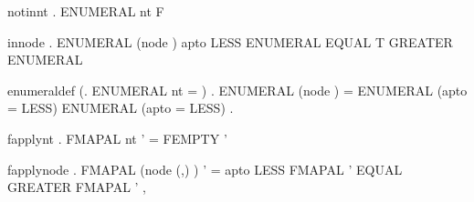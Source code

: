 \newcommand{\headingthree}[1]{\smallskip\noindent\textbf{#1}\ \ }
\begin{SaveVerbatim}{notinnt}
\HOLTokenTurnstile{} \HOLTokenForall{} .  \HOLTokenIn{} ENUMERAL  nt \HOLTokenEquiv{} F
\end{SaveVerbatim}
\begin{SaveVerbatim}{innode}
\HOLTokenTurnstile{} \HOLTokenForall{}    .
      \HOLTokenIn{} ENUMERAL  (node   ) \HOLTokenEquiv{}
      apto    
       LESS \HOLTokenImp{}  \HOLTokenIn{} ENUMERAL  
     \HOLTokenBar{} EQUAL \HOLTokenImp{} T
     \HOLTokenBar{} GREATER \HOLTokenImp{}  \HOLTokenIn{} ENUMERAL  
\end{SaveVerbatim}
\begin{SaveVerbatim}{enumeraldef}
\HOLTokenTurnstile{} (\HOLTokenForall{}. ENUMERAL  nt = \HOLTokenLeftbrace{}\HOLTokenRightbrace{}) \HOLTokenConj{}
   \HOLTokenForall{}   .
     ENUMERAL  (node   ) =
     \HOLTokenLeftbrace{} \HOLTokenBar{}  \HOLTokenIn{} ENUMERAL   \HOLTokenConj{} (apto    = LESS)\HOLTokenRightbrace{} \HOLTokenUnion{} \HOLTokenLeftbrace{}\HOLTokenRightbrace{} \HOLTokenUnion{}
     \HOLTokenLeftbrace{} \HOLTokenBar{}  \HOLTokenIn{} ENUMERAL   \HOLTokenConj{} (apto    = LESS)\HOLTokenRightbrace{} .
\end{SaveVerbatim}
\begin{SaveVerbatim}{fapplynt}
\HOLTokenTurnstile{} \HOLTokenForall{} . FMAPAL  nt '  = FEMPTY ' 
\end{SaveVerbatim}
\begin{SaveVerbatim}{fapplynode}
\HOLTokenTurnstile{} \HOLTokenForall{}     .
     FMAPAL  (node  (,) ) '  =
      apto    
       LESS \HOLTokenImp{} FMAPAL   ' 
     \HOLTokenBar{} EQUAL \HOLTokenImp{} 
     \HOLTokenBar{} GREATER \HOLTokenImp{} FMAPAL   '  ,
\end{SaveVerbatim}

